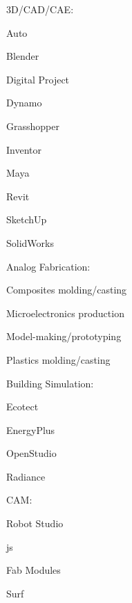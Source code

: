 \documentclass[letterpaper, oneside, 10pt]{article}
\begin{document}
\setlength{\multicolsep}{10pt}
\begin{multicols}{2}
{%
  \RaggedRight%
  {\jostmedium 3D/CAD/CAE:}%
    \begin{itemize*}[%
      label=\relax, labelwidth=0pt, itemjoin=\space\char"00B7%
    ]%
      \item {}%
      \item Auto%
      \item Blender%
      \item Digital Project%
      \item Dynamo%
      \item {}%
      \item Grasshopper%
      \item Inventor%
      \item Maya%
      \item Revit%
      \item {}%
      \item SketchUp%
      \item SolidWorks%
    \end{itemize*}


  {\jostmedium Analog Fabrication:}%
    \begin{itemize*}[%
      label=\relax, labelwidth=0pt, itemjoin=\space\char"00B7%
    ]%
      \item Composites molding/casting%
      \item Microelectronics production%
      \item Model-making/prototyping%
      \item Plastics molding/casting%
    \end{itemize*}


  {\jostmedium Building Simulation:}%
    \begin{itemize*}[%
      label=\relax, labelwidth=0pt, itemjoin=\space\char"00B7%
    ]%
      \item {}%
      \item {}%
      \item Ecotect%
      \item EnergyPlus%
      \item {}%
      \item OpenStudio%
      \item Radiance%
    \end{itemize*}


  {\jostmedium CAM:}%
    \begin{itemize*}[%
      label=\relax, labelwidth=0pt, itemjoin=\space\char"00B7%
    ]%
      \item {} Robot Studio%
      \item {}js%
      \item Fab Modules %
      \item {}%
      \item Surf%
    \end{itemize*}


}
\end{multicols}
\end{document}
